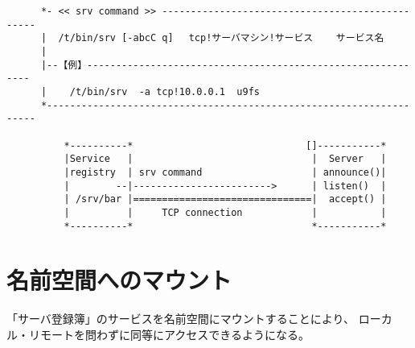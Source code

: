 \begin{verbatim}
      *- << srv command >> ------------------------------------------------
      |  /t/bin/srv [-abcC q] 　tcp!サーバマシン!サービス    サービス名   
      |
      |--【例】------------------------------------------------------------
      |    /t/bin/srv  -a tcp!10.0.0.1  u9fs  
      *--------------------------------------------------------------------

          *----------*                              []-----------*
          |Service   |                               |  Server   |    
          |registry  | srv command                   | announce()|  
          |        --|------------------------>      | listen()  |  
          | /srv/bar |===============================|  accept() |  
          |          |     TCP connection            |           |  
          *----------*                               *-----------*
\end{verbatim}


\section{名前空間へのマウント}

      「サーバ登録簿」のサービスを名前空間にマウントすることにより、
    ローカル・リモートを問わずに同等にアクセスできるようになる。

